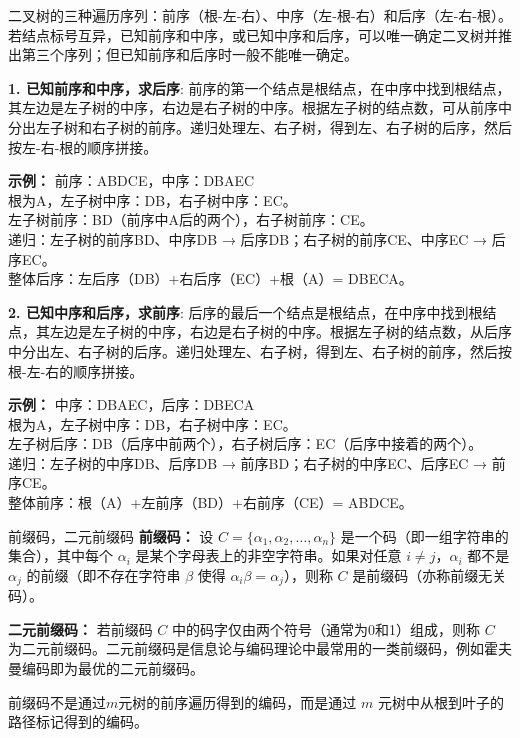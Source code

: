 二叉树的三种遍历序列：前序（根-左-右）、中序（左-根-右）和后序（左-右-根）。若结点标号互异，已知前序和中序，或已知中序和后序，可以唯一确定二叉树并推出第三个序列；但已知前序和后序时一般不能唯一确定。

    \textbf{1. 已知前序和中序，求后序}:
    前序的第一个结点是根结点，在中序中找到根结点，其左边是左子树的中序，右边是右子树的中序。根据左子树的结点数，可从前序中分出左子树和右子树的前序。递归处理左、右子树，得到左、右子树的后序，然后按左-右-根的顺序拼接。

    \textbf{示例：}
    前序：ABDCE，中序：DBAEC \\
    根为A，左子树中序：DB，右子树中序：EC。 \\
    左子树前序：BD（前序中A后的两个），右子树前序：CE。 \\
    递归：左子树的前序BD、中序DB → 后序DB；右子树的前序CE、中序EC → 后序EC。 \\
    整体后序：左后序（DB）+右后序（EC）+根（A）= DBECA。

    \textbf{2. 已知中序和后序，求前序}:
    后序的最后一个结点是根结点，在中序中找到根结点，其左边是左子树的中序，右边是右子树的中序。根据左子树的结点数，从后序中分出左、右子树的后序。递归处理左、右子树，得到左、右子树的前序，然后按根-左-右的顺序拼接。

    \textbf{示例：}
    中序：DBAEC，后序：DBECA \\
    根为A，左子树中序：DB，右子树中序：EC。 \\
    左子树后序：DB（后序中前两个），右子树后序：EC（后序中接着的两个）。 \\
    递归：左子树的中序DB、后序DB → 前序BD；右子树的中序EC、后序EC → 前序CE。 \\
    整体前序：根（A）+左前序（BD）+右前序（CE）= ABDCE。

\begin{definition}{前缀码，二元前缀码}{}
\textbf{前缀码：} 设 $C = \{\alpha_1, \alpha_2, \dots, \alpha_n\}$ 是一个码（即一组字符串的集合），其中每个 $\alpha_i$ 是某个字母表上的非空字符串。如果对任意 $i \neq j$，$\alpha_i$ 都不是 $\alpha_j$ 的前缀（即不存在字符串 $\beta$ 使得 $\alpha_i \beta = \alpha_j$），则称 $C$ 是前缀码（亦称前缀无关码）。

\textbf{二元前缀码：} 若前缀码 $C$ 中的码字仅由两个符号（通常为0和1）组成，则称 $C$ 为二元前缀码。二元前缀码是信息论与编码理论中最常用的一类前缀码，例如霍夫曼编码即为最优的二元前缀码。
\end{definition}
前缀码不是通过$m$元树的前序遍历得到的编码，而是通过 $m$ 元树中从根到叶子的路径标记得到的编码。


